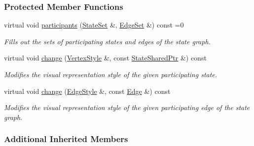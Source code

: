 \subsubsection*{Protected Member Functions}
\begin{DoxyCompactItemize}
\item 
virtual void \hyperlink{structUniformChange_aabe64e47649e99afee7a67969eb98c90}{participants} (\hyperlink{structUniformChange_afc89af5d5e897d7664eb9ae7770d145c}{State\+Set} \&, \hyperlink{structUniformChange_a2afec8b1a5887f2c6fad054d6b739fc5}{Edge\+Set} \&) const =0\hypertarget{structUniformChange_aabe64e47649e99afee7a67969eb98c90}{}\label{structUniformChange_aabe64e47649e99afee7a67969eb98c90}

\begin{DoxyCompactList}\small\item\em Fills out the sets of participating states and edges of the state graph. \end{DoxyCompactList}\item 
virtual void \hyperlink{structUniformChange_a15bdb40193102522bb0a1472891a9d09}{change} (\hyperlink{structVertexStyle}{Vertex\+Style} \&, const \hyperlink{structEventBase_a2c0edb5cda08ce1965f3440a97b3fc87}{State\+Shared\+Ptr} \&) const \hypertarget{structUniformChange_a15bdb40193102522bb0a1472891a9d09}{}\label{structUniformChange_a15bdb40193102522bb0a1472891a9d09}

\begin{DoxyCompactList}\small\item\em Modifies the visual representation style of the given participating state. \end{DoxyCompactList}\item 
virtual void \hyperlink{structUniformChange_ab9f9977561dbc59efd9bb090f74fa034}{change} (\hyperlink{structEdgeStyle}{Edge\+Style} \&, const \hyperlink{structUniformChange_a34b7655a38ac1deb98a5978cb1ad5cf6}{Edge} \&) const \hypertarget{structUniformChange_ab9f9977561dbc59efd9bb090f74fa034}{}\label{structUniformChange_ab9f9977561dbc59efd9bb090f74fa034}

\begin{DoxyCompactList}\small\item\em Modifies the visual representation style of the given participating edge of the state graph. \end{DoxyCompactList}\end{DoxyCompactItemize}
\subsubsection*{Additional Inherited Members}


